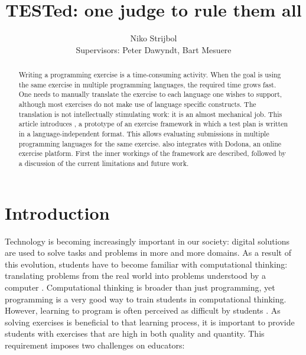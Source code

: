\documentclass[5p,number]{elsarticle}
\title{TESTed: one judge to rule them all}
\author{Niko Strijbol \\ Supervisors: Peter Dawyndt, Bart Mesuere}
\begin{document}
    \setmainfont[Ligatures=TeX,Numbers=OldStyle,Contextuals=Alternate]{Libertinus Serif}
    \setsansfont[Ligatures=TeX,Numbers=OldStyle,Contextuals=Alternate]{Libertinus Sans}
    \setmonofont[Scale=MatchLowercase,Contextuals={Alternate}]{Jetbrains Mono}

    \begin{abstract}
        Writing a programming exercise is a time-consuming activity.
        When the goal is using the same exercise in multiple programming languages, the required time grows fast.
        One needs to manually translate the exercise to each language one wishes to support, although most exercises do not make use of language specific constructs.
        The translation is not intellectually stimulating work: it is an almost mechanical job.
        This article introduces \tested{}, a prototype of an exercise framework in which a test plan is written in a language-independent format.
        This allows evaluating submissions in multiple programming languages for the same exercise.
        \tested{} also integrates with Dodona, an online exercise platform.
        First the inner workings of the framework are described, followed by a discussion of the current limitations and future work.
    \end{abstract}

    \maketitle

    \section{Introduction}\label{sec:introduction}
    
    Technology is becoming increasingly important in our society: digital solutions are used to solve tasks and problems in more and more domains.
    As a result of this evolution, students have to become familiar with computational thinking: translating problems from the real world into problems understood by a computer \cite{bastiaensen2017}.
    Computational thinking is broader than just programming, yet programming is a very good way to train students in computational thinking.
    However, learning to program is often perceived as difficult by students \cite{10.1145/3293881.3295779}.
    As solving exercises is beneficial to that learning process, it is important to provide students with exercises that are high in both quality and quantity.
    This requirement imposes two challenges on educators:
\end{document}
